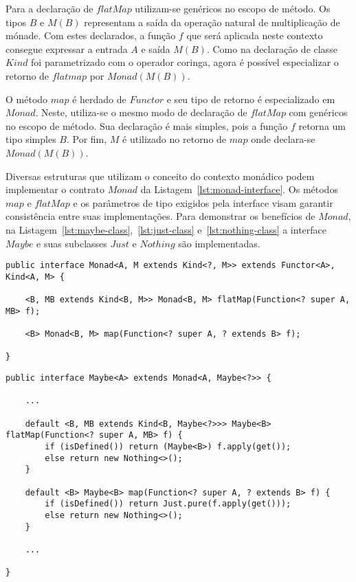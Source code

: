\documentclass[10pt, conference]{IEEEtran}
\begin{document}
Para a declaração de $flatMap$ utilizam-se genéricos no escopo de método. Os tipos $B$ e $M(B)$ representam a saída da operação natural de multiplicação de mónade. Com estes declarados, a função $f$ que será aplicada neste contexto consegue expressar a entrada $A$ e saída $M(B)$. Como na declaração de classe $Kind$ foi parametrizado com o operador coringa, agora é possível especializar o retorno de $flatmap$ por $Monad(M(B))$.

O método $map$ é herdado de $Functor$ e seu tipo de retorno é especializado em $Monad$. Neste,  utiliza-se o mesmo modo de declaração de $flatMap$ com genéricos no escopo de método. Sua declaração é mais simples, pois a função $f$ retorna um tipo simples $B$. Por fim, $M$ é utilizado no retorno de $map$ onde declara-se $Monad(M(B))$.

Diversas estruturas que utilizam o conceito do contexto monádico podem implementar o contrato $Monad$ da Listagem~\ref{lst:monad-interface}. Os métodos $map$ e $flatMap$ e os parâmetros de tipo exigidos pela interface visam garantir consistência entre suas implementações. Para demonstrar os benefícios de $Monad$, na Listagem~\ref{lst:maybe-class},~\ref{lst:just-class} e~\ref{lst:nothing-class} a interface $Maybe$ e suas subclasses $Just$ e $Nothing$ são implementadas.

\begin{lstlisting}[float = *, caption = {Interface $Monad$}, label = {lst:monad-interface}]
public interface Monad<A, M extends Kind<?, M>> extends Functor<A>, Kind<A, M> {

	<B, MB extends Kind<B, M>> Monad<B, M> flatMap(Function<? super A, MB> f);

	<B> Monad<B, M> map(Function<? super A, ? extends B> f);

}
\end{lstlisting}

\begin{lstlisting}[float = *, caption = {Interface $Maybe$}, label = {lst:maybe-class}]
public interface Maybe<A> extends Monad<A, Maybe<?>> {

	...
	
	default <B, MB extends Kind<B, Maybe<?>>> Maybe<B> flatMap(Function<? super A, MB> f) {
		if (isDefined()) return (Maybe<B>) f.apply(get());
		else return new Nothing<>();
	}

	default <B> Maybe<B> map(Function<? super A, ? extends B> f) {
		if (isDefined()) return Just.pure(f.apply(get()));
		else return new Nothing<>();
	}
	
	...	
	
}
\end{lstlisting}
\end{document}
